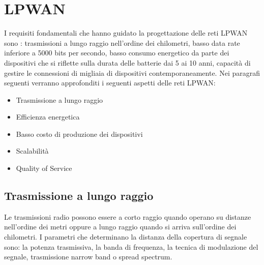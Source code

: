 \documentclass[12pt,a4paper,openright,twoside]{report}
\begin{document}
\chapter{LPWAN}
I requisiti fondamentali che hanno guidato la progettazione delle reti LPWAN sono : trasmissioni a lungo raggio nell'ordine dei chilometri, basso data rate inferiore a 5000 bits per secondo, basso consumo energetico da parte dei dispositivi che si riflette sulla durata delle batterie dai 5 ai 10 anni, capacit\`a di gestire le connessioni di migliaia di dispositivi contemporaneamente. \cite{K2}
Nei paragrafi seguenti verranno approfonditi i seguenti aspetti delle reti LPWAN:
\begin{itemize}                       
\item Trasmissione a lungo raggio 
 \item Efficienza energetica
\item Basso costo di produzione dei dispositivi
\item Scalabilit\`a
\item Quality of Service
\end{itemize}

\section{Trasmissione a lungo raggio}
Le trasmissioni radio possono essere a corto raggio quando operano su distanze nell'ordine dei metri oppure a lungo raggio quando si arriva sull'ordine dei chilometri.
I parametri che determinano la distanza della copertura di segnale sono: la potenza trasmissiva, la banda di frequenza, la tecnica di modulazione del segnale, trasmissione narrow band  o spread spectrum. 
\end{document}
